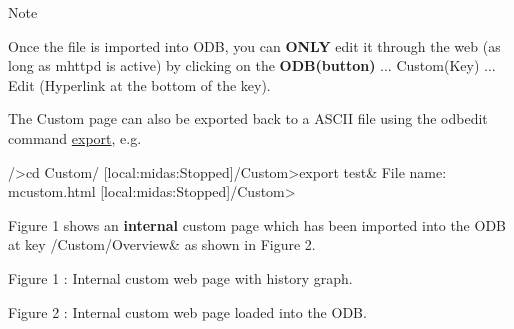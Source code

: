 \begin{DoxyNote}{Note}

\begin{DoxyItemize}
\item Once the file is imported into ODB, you can {\bfseries ONLY} edit it through the web (as long as mhttpd is active) by clicking on the {\bfseries ODB(button)} ... Custom(Key) ... Edit (Hyperlink at the bottom of the key).
\end{DoxyItemize}
\end{DoxyNote}

\begin{DoxyItemize}
\item The Custom page can also be exported back to a ASCII file using the odbedit command \hyperlink{RC_odbedit_examples_RC_odbedit_export}{export}, e.g. 
\begin{DoxyCode}
  />cd Custom/
  [local:midas:Stopped]/Custom>export test&
  File name: mcustom.html
  [local:midas:Stopped]/Custom>
\end{DoxyCode}

\end{DoxyItemize}

Figure 1 shows an {\bfseries internal} custom page which has been imported into the ODB at key /Custom/Overview\& as shown in Figure 2.

\par
\par
\par
 \begin{center}  Figure 1 : Internal custom web page with history graph. \par
\par
\par
  \end{center}  \par
\par
\par


\par
\par
\par
 \begin{center}  Figure 2 : Internal custom web page loaded into the ODB. \par
\par
\par
  \end{center}  \par
\par
\par



